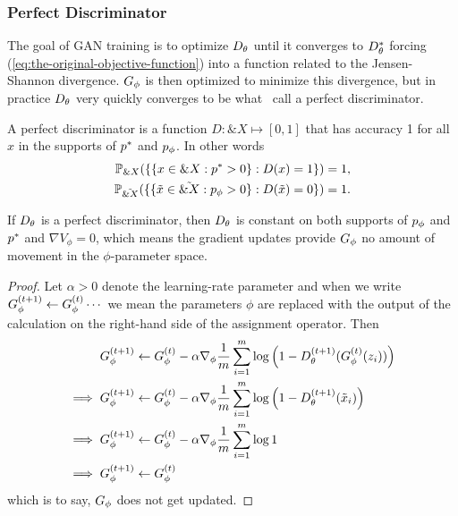 
\subsubsection*{Perfect Discriminator}

The goal of GAN training is to optimize $D_\theta$ until it converges to
$D_\theta^*$ forcing (\ref{eq:the-original-objective-function}) into a
function related to the Jensen-Shannon divergence.  $G_\phi$ is then
optimized to minimize this divergence, but in practice $D_\theta$ very
quickly converges to be what~\cite{ref:arjovsky-towards-2017} call a
perfect discriminator.

\begin{definition}%
  \label{def:perfect-discriminator}
  A \textnormal{\sffamily perfect discriminator} is a function
  $D: \&X \mapsto [0,1]$ that has accuracy 1 for all $x$ in the
  supports of $p^*$ and $p_{\phi}$. In other words
  \begin{align}
    \mathbb{P}_{\&X}(\{\{x \in \&X : p^* > 0\} : D(x) = 1 \} )= 1, \\
    \mathbb{P}_{\tilde{\&X}}(\{\{\tilde{x} \in \tilde{\&X} : p_{\phi} > 0\} : D(\tilde{x}) = 0 \} )= 1.
  \end{align}
\end{definition}

\begin{theorem}%
  \label{thm:perfect-discriminator}
  If $D_\theta$ is a perfect discriminator, then $D_\theta$ is constant on both
  supports of $p_{\phi}$ and $p^*$ and $\nabla{V_\phi} = 0$, which means
  the gradient updates provide $G_\phi$ no amount of movement in the
  $\phi$-parameter space.
\end{theorem}

\begin{proof}%
  \label{prf:perfect-discriminator}
  Let $\alpha > 0$ denote the learning-rate parameter and when we
  write $G_\phi^{(t+1)} \gets G_\phi^{(t)} \cdots$ we mean the parameters $\phi$ are replaced
  with the output of the calculation on the right-hand side of the
  assignment operator. Then
  \begin{align}
    \label{eq:g-updates-no-good}
    G_\phi^{(t+1)} & \gets G_\phi^{(t)} - \alpha\nabla_\phi {1 \over m} \sum_{i=1}^m \log\left( 1 - D_\theta^{(t+1)}(G_\phi^{(t)}(z_i)) \right) \\
    \implies G_\phi^{(t+1)} & \gets G_\phi^{(t)} - \alpha\nabla_\phi {1 \over m} \sum_{i=1}^m \log{ \left( 1 - D_\theta^{(t+1)}(\tilde{x}_i) \right)} \\
    \implies G_\phi^{(t+1)} & \gets G_\phi^{(t)} - \alpha\nabla_\phi {1 \over m} \sum_{i=1}^m \log{1} \\
    \implies G_\phi^{(t+1)} & \gets G_\phi^{(t)}
  \end{align} which is to say, $G_\phi$ does not get updated.
\end{proof}

